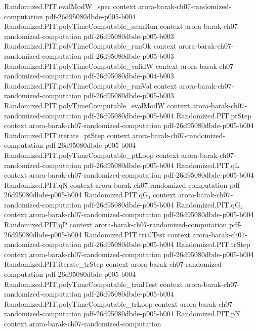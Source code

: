 \begin{theorem}
\proofstep
  {Randomized.PIT.evalModW_spec}
  {context}
  {arora-barak-ch07-randomized-computation}
  {pdf-26d95080dbde-p005-b004}
\proofstep
  {Randomized.PIT.polyTimeComputable_scanRun}
  {context}
  {arora-barak-ch07-randomized-computation}
  {pdf-26d95080dbde-p005-b003}
\proofstep
  {Randomized.PIT.polyTimeComputable_runOk}
  {context}
  {arora-barak-ch07-randomized-computation}
  {pdf-26d95080dbde-p005-b003}
\proofstep
  {Randomized.PIT.polyTimeComputable_validW}
  {context}
  {arora-barak-ch07-randomized-computation}
  {pdf-26d95080dbde-p004-b003}
\proofstep
  {Randomized.PIT.polyTimeComputable_runVal}
  {context}
  {arora-barak-ch07-randomized-computation}
  {pdf-26d95080dbde-p005-b003}
\proofstep
  {Randomized.PIT.polyTimeComputable_evalModW}
  {context}
  {arora-barak-ch07-randomized-computation}
  {pdf-26d95080dbde-p005-b004}
\proofstep
  {Randomized.PIT.ptStep}
  {context}
  {arora-barak-ch07-randomized-computation}
  {pdf-26d95080dbde-p005-b004}
\proofstep
  {Randomized.PIT.iterate_ptStep}
  {context}
  {arora-barak-ch07-randomized-computation}
  {pdf-26d95080dbde-p005-b004}
\proofstep
  {Randomized.PIT.polyTimeComputable_ptLoop}
  {context}
  {arora-barak-ch07-randomized-computation}
  {pdf-26d95080dbde-p005-b004}
\proofstep
  {Randomized.PIT.qL}
  {context}
  {arora-barak-ch07-randomized-computation}
  {pdf-26d95080dbde-p005-b004}
\proofstep
  {Randomized.PIT.qN}
  {context}
  {arora-barak-ch07-randomized-computation}
  {pdf-26d95080dbde-p005-b004}
\proofstep
  {Randomized.PIT.qG₁}
  {context}
  {arora-barak-ch07-randomized-computation}
  {pdf-26d95080dbde-p005-b004}
\proofstep
  {Randomized.PIT.qG₂}
  {context}
  {arora-barak-ch07-randomized-computation}
  {pdf-26d95080dbde-p005-b004}
\proofstep
  {Randomized.PIT.qP}
  {context}
  {arora-barak-ch07-randomized-computation}
  {pdf-26d95080dbde-p005-b004}
\proofstep
  {Randomized.PIT.trialTest}
  {context}
  {arora-barak-ch07-randomized-computation}
  {pdf-26d95080dbde-p005-b004}
\proofstep
  {Randomized.PIT.trStep}
  {context}
  {arora-barak-ch07-randomized-computation}
  {pdf-26d95080dbde-p005-b004}
\proofstep
  {Randomized.PIT.iterate_trStep}
  {context}
  {arora-barak-ch07-randomized-computation}
  {pdf-26d95080dbde-p005-b004}
\proofstep
  {Randomized.PIT.polyTimeComputable_trialTest}
  {context}
  {arora-barak-ch07-randomized-computation}
  {pdf-26d95080dbde-p005-b004}
\proofstep
  {Randomized.PIT.polyTimeComputable_trLoop}
  {context}
  {arora-barak-ch07-randomized-computation}
  {pdf-26d95080dbde-p005-b004}
\proofstep
  {Randomized.PIT.pN}
  {context}
  {arora-barak-ch07-randomized-computation}

\end{theorem}
